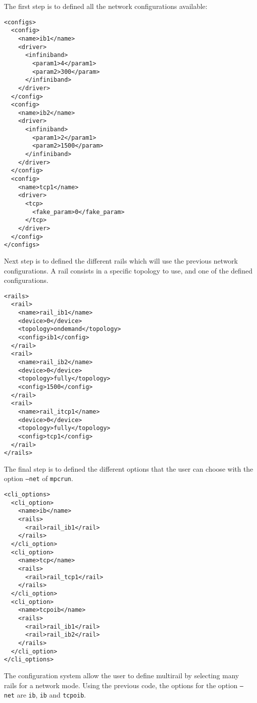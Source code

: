 \documentclass{article}
\begin{document}
\noindent The first step is to defined all the network configurations available:

\lstset{language=XML}
\begin{lstlisting}[title=Define network configurations]
<configs>
  <config>
    <name>ib1</name>
    <driver>
      <infiniband>
        <param1>4</param1>
        <param2>300</param>
      </infiniband>
    </driver>
  </config>
  <config>
    <name>ib2</name>
    <driver>
      <infiniband>
        <param1>2</param1>
        <param2>1500</param>
      </infiniband>
    </driver>
  </config>
  <config>
    <name>tcp1</name>
    <driver>
      <tcp>
        <fake_param>0</fake_param>
      </tcp>
    </driver>
  </config>
</configs>
\end{lstlisting}

\noindent Next step is to defined the different rails which will use the previous network configurations. A rail consists in a specific topology to use, and one of the defined configurations.

\lstset{language=XML}
\begin{lstlisting}[title=Define network configurations]
<rails>
  <rail>
    <name>rail_ib1</name>
    <device>0</device>
    <topology>ondemand</topology>
    <config>ib1</config>
  </rail>
  <rail>
    <name>rail_ib2</name>
    <device>0</device>
    <topology>fully</topology>
    <config>1500</config>
  </rail>
  <rail>
    <name>rail_itcp1</name>
    <device>0</device>
    <topology>fully</topology>
    <config>tcp1</config>
  </rail>
</rails>
\end{lstlisting}

\noindent The final step is to defined the different options that the user can choose with the option \texttt{--net} of \texttt{mpcrun}.

\lstset{language=XML}
\begin{lstlisting}[title=Define network modes]
<cli_options>
  <cli_option>
    <name>ib</name>
    <rails>
      <rail>rail_ib1</rail>
    </rails>
  </cli_option>
  <cli_option>
    <name>tcp</name>
    <rails>
      <rail>rail_tcp1</rail>
    </rails>
  </cli_option>
  <cli_option>
    <name>tcpoib</name>
    <rails>
      <rail>rail_ib1</rail>
      <rail>rail_ib2</rail>
    </rails>
  </cli_option>
</cli_options>
\end{lstlisting}

\noindent The configuration system allow the user to define multirail by selecting many rails for a network mode. Using the previous code, the options for the option \texttt{--net} are \texttt{ib}, \texttt{ib} and \texttt{tcpoib}.
\end{document}
